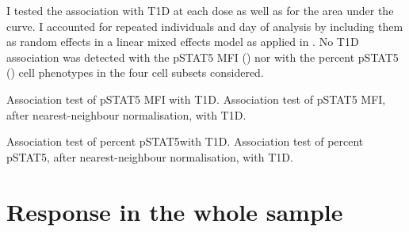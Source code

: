I tested the association with T1D at each dose as well as for the area under the curve.
I accounted for repeated individuals and day of analysis by including them as random effects in a linear mixed effects model as applied in .
No T1D association was detected with the pSTAT5 MFI 
()
nor with the percent pSTAT5\positive
()
cell phenotypes in the four cell subsets considered.


{ Association test of pSTAT5 MFI with T1D. }
{ }
{ Association test of pSTAT5 MFI, after nearest-neighbour normalisation, with T1D. }
{ }
{ }

{ Association test of percent pSTAT5\positive with T1D. }
{ }
{ Association test of percent pSTAT5\positive, after nearest-neighbour normalisation, with T1D. }
{ } 


\section{Response in the whole sample}

